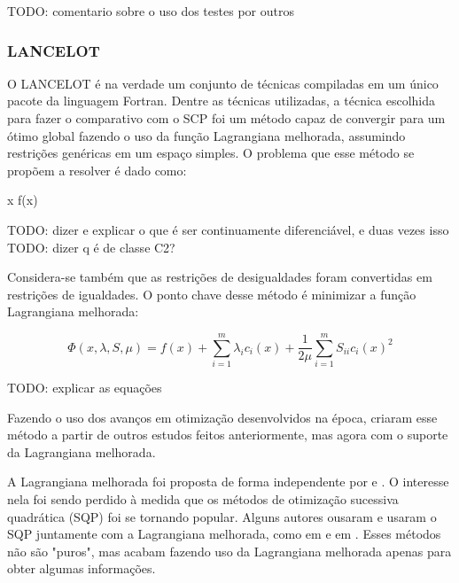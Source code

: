 TODO: comentario sobre o uso dos testes por outros

\subsubsection{LANCELOT}
\label{sec_lancelot}
O LANCELOT \cite{conn1991globally} é na verdade um conjunto de técnicas compiladas em um único
pacote da  linguagem Fortran. Dentre as técnicas utilizadas, a técnica escolhida para fazer o
comparativo com o SCP foi um método capaz de convergir para um ótimo global fazendo o uso da
função Lagrangiana melhorada, assumindo restrições genéricas em um espaço simples. O problema
que esse método se propõem a resolver é dado como:



\vspace{-15pt}
\begin{mini!}
{x}{ f(x) \label{lancelot_obj}}{\label{prob_lancelot}}{}
\end{mini!}

TODO: dizer e explicar o que é ser continuamente diferenciável, e duas vezes isso
TODO: dizer q é de classe C2?


Considera-se também que as restrições de desigualdades foram convertidas em restrições de
igualdades. O ponto chave desse método é minimizar a função Lagrangiana melhorada:

\vspace{-15pt}
\begin{equation}
  \Phi(x, \lambda, S, \mu) = f(x) + \sum_{i=1}^{m} \lambda_i c_i(x) + \frac{1}{2\mu} \sum_{i=1}^m S_{ii} c_i(x)^2
\end{equation}

TODO: explicar as equações

Fazendo o uso dos avanços em otimização desenvolvidos na época, criaram esse método a partir
de outros estudos feitos anteriormente, mas agora com o suporte da Lagrangiana melhorada.

A Lagrangiana melhorada foi proposta de forma independente por \cite{hestenes1969multiplier}
e \cite{powell1969method}. O interesse nela foi sendo perdido à medida que os métodos
de otimização sucessiva quadrática (SQP) foi se tornando popular. Alguns autores ousaram e
usaram o SQP juntamente com a Lagrangiana melhorada, como em \cite{schittkowski1982nonlinear}
e em \cite{gill1986some}. Esses métodos não são "puros", mas acabam fazendo uso da Lagrangiana
melhorada apenas para obter algumas informações.

